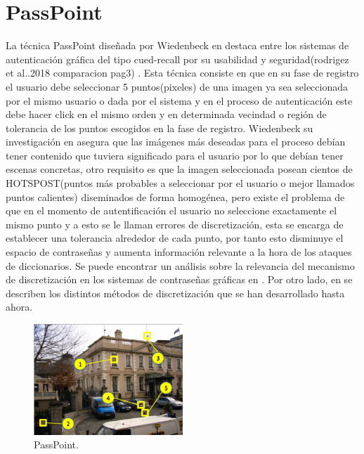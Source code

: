 \documentclass[12pt]{report}
\begin{document}
\section{PassPoint}
	La técnica PassPoint diseñada por Wiedenbeck en \cite{1} destaca entre los sistemas de autenticación gráfica del tipo cued-recall por su usabilidad y seguridad(rodrigez et al..2018 comparacion pag3) .
	Esta técnica consiste en que  en su fase de registro el
	usuario debe seleccionar 5 puntos(pixeles) de una imagen ya sea seleccionada por el mismo usuario o dada por el sistema  y en el proceso de autenticación este debe hacer click en el mismo orden y en determinada  vecindad o región de tolerancia de los puntos escogidos en la fase de registro.
	Wiedenbeck su investigación en \cite{1} asegura que las imágenes más deseadas para el proceso debían tener contenido que tuviera significado para el usuario por lo que debían tener escenas concretas, otro requisito es que la imagen seleccionada posean cientos de HOTSPOST(puntos más probables a seleccionar por el usuario o mejor llamados puntos calientes) diseminados de forma homogénea, pero existe el problema de que en el momento de autentificación el usuario no seleccione exactamente el mismo punto y a esto se le llaman errores de discretización, esta se encarga de establecer una tolerancia alrededor de cada punto, por tanto esto disminuye el espacio de contraseñas y aumenta información relevante a la hora de los ataques de diccionarios. Se puede encontrar un análisis sobre la relevancia del mecanismo de discretización en los sistemas de contraseñas gráficas en \cite{14,15,16}. Por otro lado, en \cite{14,15,16,17} se describen los distintos métodos de discretización que se han desarrollado hasta ahora.\\
	\begin{figure}[ht]
		\centering
		\includegraphics[width=0.5\textwidth]{passpoint.png}
		\caption{PassPoint.}
		\label{fig:PassPoint}
	\end{figure}
	
\end{document}
